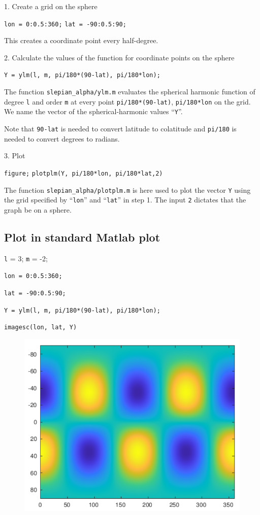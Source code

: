 \documentclass{article}
\begin{document}
\setlength{\parskip}{0.5cm plus4mm minus3mm}

1. Create a grid on the sphere

\verb+lon = 0:0.5:360;+
\verb+lat = -90:0.5:90;+

This creates a coordinate point every half-degree.

2. Calculate the values of the function for coordinate points on the sphere

\verb+Y = ylm(l, m, pi/180*(90-lat), pi/180*lon);+

The function \verb+slepian_alpha/ylm.m+ evaluates the spherical harmonic function of degree \verb+l+ and order \verb+m+ at every point \verb+pi/180*(90-lat)+, \verb+pi/180*lon+ on the grid. We name the vector of the spherical-harmonic values “\verb+Y+”.

Note that \verb+90-lat+ is needed to convert latitude to colatitude and \verb+pi/180+ is needed to convert degrees to radians.

3. Plot

\verb+figure;+
\verb+plotplm(Y, pi/180*lon, pi/180*lat,2)+

The function \verb+slepian_alpha/plotplm.m+ is here used to plot the vector \verb+Y+ using the grid specified by “\verb+lon+” and “\verb+lat+” in step 1. The input \verb+2+ dictates that the graph be on a sphere.

\subsection{Plot in standard Matlab plot}

\setlength{\parskip}{.1mm}

\verb+l+ = 3; \verb+m+ = -2;

\verb+lon = 0:0.5:360;+

\verb+lat = -90:0.5:90;+

\verb+Y = ylm(l, m, pi/180*(90-lat), pi/180*lon);+

\verb+imagesc(lon, lat, Y)+

\begin{figure}[H]
\includegraphics[scale=.6]{standard_matlab_plot}
\end{figure}
\end{document}
